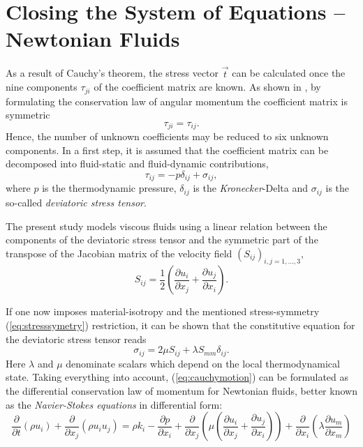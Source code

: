 \section{Closing the System of Equations -- Newtonian Fluids}
\label{sec:fundclosing}

As a result of Cauchy's theorem, the stress vector \( \vec{t} \) can be calculated once the nine components \(\tau_{ji}\) of the coefficient matrix are known. As shown in \cite{kundu12,spurk10}, by formulating the conservation law of angular momentum the coefficient matrix is symmetric
\begin{equation}
  \label{eq:stresssymetry}
  \tau_{ji} = \tau_{ij}.
\end{equation}
Hence, the number of unknown coefficients may be reduced to six unknown components. In a first step, it is assumed that the coefficient matrix can be decomposed into fluid-static and fluid-dynamic contributions,
\begin{displaymath}
  \tau_{ij} = -p \delta_{ij} + \sigma_{ij},
\end{displaymath}
where \(p\) is the thermodynamic pressure, \(\delta_{ij}\) is the \emph{Kronecker}-Delta and \( \sigma_{ij} \) is the so-called \emph{deviatoric stress tensor}. 
    
The present study models viscous fluids using a linear relation between the components of the deviatoric stress tensor and the symmetric part of the transpose of the Jacobian matrix of the velocity field \(\left( S_{ij} \right)_{i,j=1,\dots,3}\),
\begin{displaymath}
  S_{ij} = \frac{1}{2} \left( \frac{\partial u_i}{\partial x_j} + \frac{\partial u_j}{\partial x_i} \right).
\end{displaymath}

If one now imposes material-isotropy and the mentioned stress-symmetry (\ref{eq:stresssymetry}) restriction, it can be shown \cite{aris62} that the constitutive equation for the deviatoric stress tensor reads 
\begin{displaymath}
  \sigma_{ij} = 2 \mu S_{ij} + \lambda S_{mm} \delta_{ij}.
\end{displaymath}
Here \(\lambda\) and \(\mu\) denominate scalars which depend on the local thermodynamical state. Taking everything into account, (\ref{eq:cauchymotion}) can be formulated as the differential conservation law of momentum for Newtonian fluids, better known as the \emph{Navier-Stokes equations} in differential form:
\begin{equation}
\label{eq:nsfull}
\frac{\partial }{\partial t} \left(\rho u_i \right)
+ \frac{\partial}{\partial x_j} \left( \rho u_i  u_j \right) 
= \rho k_i
- \frac{\partial p}{\partial x_i}
+ \frac{\partial}{\partial x_j} \left( \mu  \left( \frac{\partial u_i}{\partial x_j} 
                                        + \frac{\partial u_j}{\partial x_i} \right) \right)
+ \frac{\partial}{\partial x_i} \left(\lambda \frac{\partial u_m}{\partial x_m} \right)
\end{equation}

